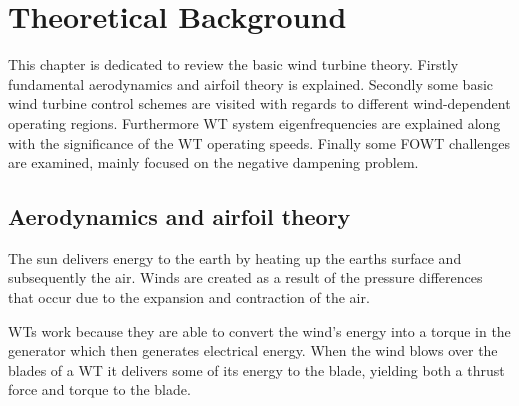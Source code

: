 \section{Theoretical Background} \label{sec:theory}
This chapter is dedicated to review the basic wind turbine theory. Firstly fundamental aerodynamics and airfoil theory is explained. Secondly some basic wind turbine control schemes are visited with regards to different wind-dependent operating regions. Furthermore WT system eigenfrequencies are explained along with the significance of the WT operating speeds. Finally some FOWT challenges are examined, mainly focused on the negative dampening problem.

\subsection{Aerodynamics and airfoil theory} \label{sec:theory_aero}
The sun delivers energy to the earth by heating up the earths surface and subsequently the air. Winds are created as a result of the pressure differences that occur due to the expansion and contraction of the air. 

WTs work because they are able to convert the wind's energy into a torque in the generator which then generates electrical energy. When the wind blows over the blades of a WT it delivers some of its energy to the blade, yielding both a thrust force and torque to the blade.

